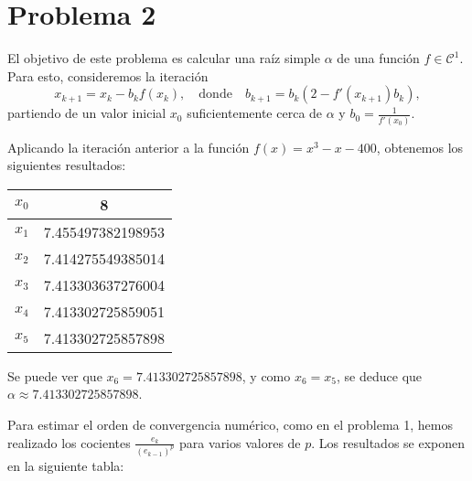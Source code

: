\documentclass[a4paper]{article}
\begin{document}
\section*{Problema 2}
El objetivo de este problema es calcular una raíz simple $\alpha$ de una función $f\in\mathcal{C}^1$. Para esto, consideremos la iteración $$x_{k+1}=x_k-b_kf(x_k),\quad\text{donde}\quad b_{k+1}=b_k(2-f'(x_{k+1})b_k),$$ partiendo de un valor inicial $x_0$ suficientemente cerca de $\alpha$ y $b_0=\frac{1}{f'(x_0)}$.\par Aplicando la iteración anterior a la función $f(x)=x^3-x-400$, obtenemos los siguientes resultados:\par
\begin{table}[ht]
    \centering
    \begin{tabular}{|c|c|}
        
        \hline
        $x_0$ & 8 \\
        \hline
        $x_1$ & 7.455497382198953 \\
        \hline
        $x_2$ & 7.414275549385014 \\
        \hline
        $x_3$ & 7.413303637276004 \\
        \hline
        $x_4$ & 7.413302725859051 \\
        \hline
        $x_5$ & 7.413302725857898 \\
        \hline
    \end{tabular}
\end{table}
Se puede ver que $x_6=7.413302725857898$, y como $x_6=x_5$, se deduce que $\alpha\approx7.413302725857898$.\par
Para estimar el orden de convergencia numérico, como en el problema 1, hemos realizado los cocientes $\frac{e_k}{(e_{k-1})^p}$ para varios valores de $p$. Los resultados se exponen en la siguiente tabla:\par
\end{document}

